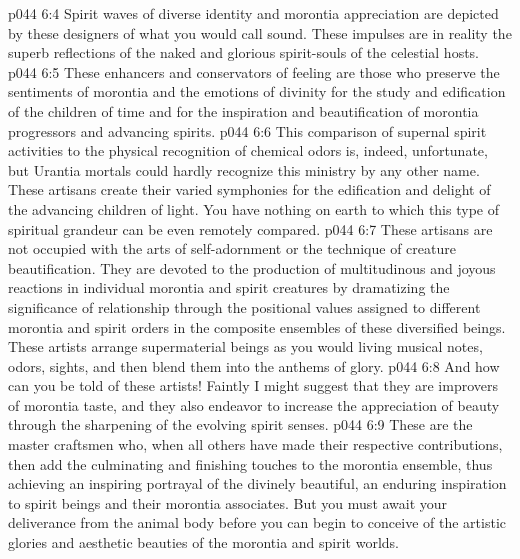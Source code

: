 \pc \vs p044 6:4 \bibnobreakspace {} Spirit waves of diverse identity and morontia appreciation are depicted by these designers of what you would call sound. These impulses are in reality the superb reflections of the naked and glorious spirit\hyp{}souls of the celestial hosts.
\pc \vs p044 6:5 \bibnobreakspace {} These enhancers and conservators of feeling are those who preserve the sentiments of morontia and the emotions of divinity for the study and edification of the children of time and for the inspiration and beautification of morontia progressors and advancing spirits.\plusone
\pc \vs p044 6:6 \bibnobreakspace {} This comparison of supernal spirit activities to the physical recognition of chemical odors is, indeed, unfortunate, but Urantia mortals could hardly recognize this ministry by any other name. These artisans create their varied symphonies for the edification and delight of the advancing children of light. You have nothing on earth to which this type of spiritual grandeur can be even remotely compared.
\pc \vs p044 6:7 \bibnobreakspace {} These artisans are not occupied with the arts of self\hyp{}adornment or the technique of creature beautification. They are devoted to the production of multitudinous and joyous reactions in individual morontia and spirit creatures by dramatizing the significance of relationship through the positional values assigned to different morontia and spirit orders in the composite ensembles of these diversified beings. These artists arrange supermaterial beings as you would living musical notes, odors, sights, and then blend them into the anthems of glory.
\pc \vs p044 6:8 \bibnobreakspace {} And how can you be told of these artists! Faintly I might suggest that they are improvers of morontia taste, and they also endeavor to increase the appreciation of beauty through the sharpening of the evolving spirit senses.
\pc \vs p044 6:9 \bibnobreakspace {} These are the master craftsmen who, when all others have made their respective contributions, then add the culminating and finishing touches to the morontia ensemble, thus achieving an inspiring portrayal of the divinely beautiful, an enduring inspiration to spirit beings and their morontia associates. But you must await your deliverance from the animal body before you can begin to conceive of the artistic glories and aesthetic beauties of the morontia and spirit worlds.
